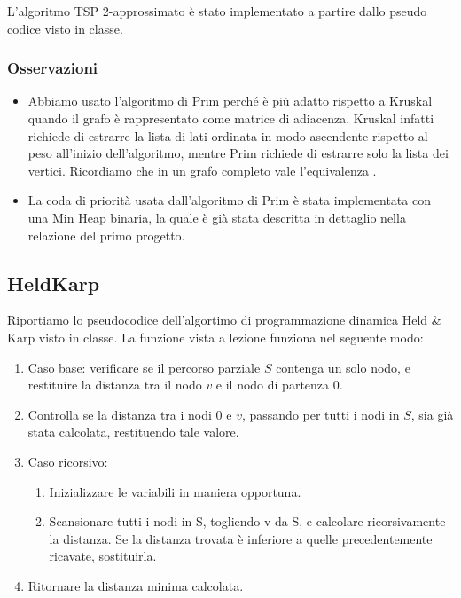 \noindent L'algoritmo TSP 2-approssimato è stato implementato a partire dallo pseudo codice visto in classe. \\

\subsubsection{Osservazioni}

\begin{itemize}
    \item Abbiamo usato l'algoritmo di Prim perché è più adatto rispetto a Kruskal quando il grafo è rappresentato come matrice di adiacenza. Kruskal infatti richiede di estrarre la lista di lati ordinata in modo ascendente rispetto al peso all'inizio dell'algoritmo, mentre Prim richiede di estrarre solo la lista dei vertici. Ricordiamo che in un grafo completo vale l'equivalenza \complexityCompleteGraph{}.

    \item La coda di priorità usata dall'algoritmo di Prim è stata implementata con una Min Heap binaria, la quale è già stata descritta in dettaglio nella relazione del primo progetto.
\end{itemize}

\subsection{HeldKarp}

Riportiamo lo pseudocodice dell'algortimo di programmazione dinamica Held \& Karp visto in classe. La funzione  vista a lezione funziona nel seguente modo:

\begin{enumerate}
    \item Caso base: verificare se il percorso parziale $S$ contenga un solo nodo, e restituire la distanza tra il nodo $v$ e il nodo di partenza $0$.
    \item Controlla se la distanza tra i nodi $0$ e $v$, passando per tutti i nodi in $S$, sia già stata calcolata, restituendo tale valore.
    \item Caso ricorsivo:
    \begin{enumerate}
        \item Inizializzare le variabili in maniera opportuna.
        \item Scansionare tutti i nodi in S, togliendo v da S, e calcolare ricorsivamente la distanza. Se la distanza trovata è inferiore a quelle precedentemente ricavate, sostituirla.
    \end{enumerate}
    \item Ritornare la distanza minima calcolata.
\end{enumerate}


